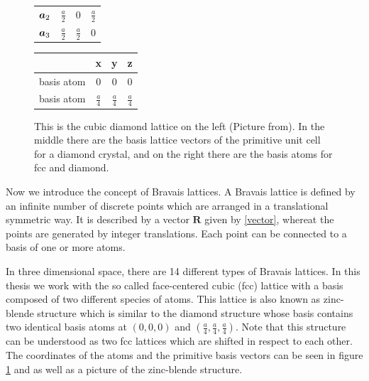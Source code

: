 \begin{figure}[b!]
\begin{minipage}[c]{.25\linewidth}
\begin{tabular}{c c c c}
				\vspace{0.2cm}
				$\boldsymbol{a}_2$ & $\frac{a}{2}$ & 0 & $\frac{a}{2}$ \\
				\vspace{0.2cm}
				$\boldsymbol{a}_3$ & $\frac{a}{2}$ & $\frac{a}{2}$ & 0 
			\end{tabular}	
		\end{minipage}
		\hfill
		\begin{minipage}[c]{.33\linewidth}
			\begin{tabular}{c c c c} 
				\hline
				& \textbf{x} & \textbf{y} & \textbf{z}\\ 
				\hline 
				\vspace{0.2cm}
				basis atom & 0 & 0 & 0 \\
				\vspace{0.2cm}
				basis atom & $\frac{a}{4}$ & $\frac{a}{4}$ & $\frac{a}{4}$
			\end{tabular}	
		\end{minipage}
		\caption{This is the cubic diamond lattice on the left (Picture from\cite{Kittel}). In the middle there are the basis lattice vectors of the primitive unit cell for a diamond crystal, and on the right there are the basis atoms for fcc and diamond.
		}\label{fcc}
	\end{figure}
	Now we introduce the concept of Bravais lattices. A Bravais lattice is defined by an infinite number of discrete points which are arranged in a translational symmetric way. It is described by a vector $\boldsymbol{R}$ given by \eqref{vector}, whereat the points are generated by integer translations. 
	Each point can be connected to a basis of one or more atoms.
	
	In three dimensional space, there are 14 different types of Bravais lattices. In this thesis we work with the so called face-centered cubic (fcc) lattice with a basis composed of two different species of atoms.
	This lattice is also known as zinc-blende structure which is similar to the diamond structure whose basis contains two identical basis atoms at $(0,0,0)$ and $(\frac{a}{4},\frac{a}{4},\frac{a}{4})$.
	Note that this structure can be understood as two fcc lattices which are shifted in respect to each other.
	The coordinates of the atoms and the primitive basis vectors can be seen in figure \ref{fcc} and as well as a picture of the zinc-blende structure.
	
